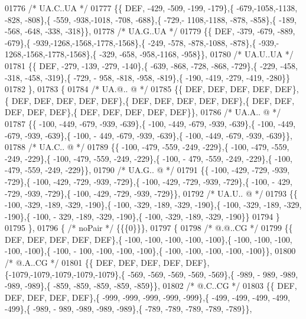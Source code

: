 \begin{DoxyCode}
01776 \textcolor{comment}{/* UA.C..UA */}
01777 \{\{  DEF, -429, -509, -199, -179\},\{ -679,-1058,-1138, -828, -808\},\{ -559, -938,-1018, -708, -688\},\{ -729,-
      1108,-1188, -878, -858\},\{ -189, -568, -648, -338, -318\}\},
01778 \textcolor{comment}{/* UA.G..UA */}
01779 \{\{  DEF, -379, -679, -889, -679\},\{ -939,-1268,-1568,-1778,-1568\},\{ -249, -578, -878,-1088, -878\},\{ -939,-
      1268,-1568,-1778,-1568\},\{ -329, -658, -958,-1168, -958\}\},
01780 \textcolor{comment}{/* UA.U..UA */}
01781 \{\{  DEF, -279, -139, -279, -140\},\{ -639, -868, -728, -868, -729\},\{ -229, -458, -318, -458, -319\},\{ -729, -
      958, -818, -958, -819\},\{ -190, -419, -279, -419, -280\}\}
01782 \},
01783 \{
01784 \textcolor{comment}{/* UA.@.. @ */}
01785 \{\{  DEF,  DEF,  DEF,  DEF,  DEF\},\{  DEF,  DEF,  DEF,  DEF,  DEF\},\{  DEF,  DEF,  DEF,  DEF,  DEF\},\{  DEF,  
      DEF,  DEF,  DEF,  DEF\},\{  DEF,  DEF,  DEF,  DEF,  DEF\}\},
01786 \textcolor{comment}{/* UA.A.. @ */}
01787 \{\{ -100, -449, -679, -939, -639\},\{ -100, -449, -679, -939, -639\},\{ -100, -449, -679, -939, -639\},\{ -100, -
      449, -679, -939, -639\},\{ -100, -449, -679, -939, -639\}\},
01788 \textcolor{comment}{/* UA.C.. @ */}
01789 \{\{ -100, -479, -559, -249, -229\},\{ -100, -479, -559, -249, -229\},\{ -100, -479, -559, -249, -229\},\{ -100, -
      479, -559, -249, -229\},\{ -100, -479, -559, -249, -229\}\},
01790 \textcolor{comment}{/* UA.G.. @ */}
01791 \{\{ -100, -429, -729, -939, -729\},\{ -100, -429, -729, -939, -729\},\{ -100, -429, -729, -939, -729\},\{ -100, -
      429, -729, -939, -729\},\{ -100, -429, -729, -939, -729\}\},
01792 \textcolor{comment}{/* UA.U.. @ */}
01793 \{\{ -100, -329, -189, -329, -190\},\{ -100, -329, -189, -329, -190\},\{ -100, -329, -189, -329, -190\},\{ -100, -
      329, -189, -329, -190\},\{ -100, -329, -189, -329, -190\}\}
01794 \}
01795 \},
01796 \{ \textcolor{comment}{/* noPair */} \{\{\{0\}\}\},
01797 \{
01798 \textcolor{comment}{/*  @.@..CG */}
01799 \{\{  DEF,  DEF,  DEF,  DEF,  DEF\},\{ -100, -100, -100, -100, -100\},\{ -100, -100, -100, -100, -100\},\{ -100, -
      100, -100, -100, -100\},\{ -100, -100, -100, -100, -100\}\},
01800 \textcolor{comment}{/*  @.A..CG */}
01801 \{\{  DEF,  DEF,  DEF,  DEF,  DEF\},\{-1079,-1079,-1079,-1079,-1079\},\{ -569, -569, -569, -569, -569\},\{ -989, -
      989, -989, -989, -989\},\{ -859, -859, -859, -859, -859\}\},
01802 \textcolor{comment}{/*  @.C..CG */}
01803 \{\{  DEF,  DEF,  DEF,  DEF,  DEF\},\{ -999, -999, -999, -999, -999\},\{ -499, -499, -499, -499, -499\},\{ -989, -
      989, -989, -989, -989\},\{ -789, -789, -789, -789, -789\}\},

\end{DoxyCode}
